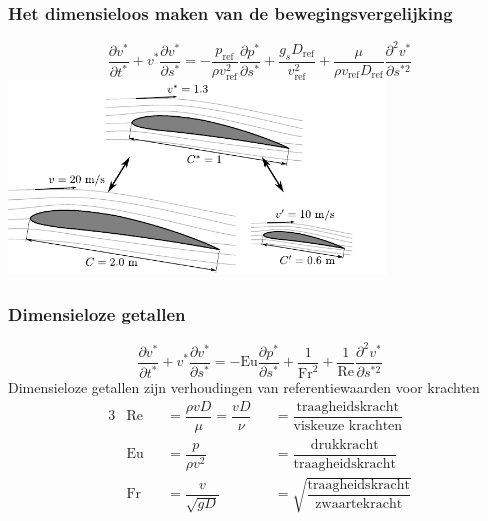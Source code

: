 \documentclass[t]{beamer}
\begin{document}
  	\begin{frame}
		\frametitle{Het dimensieloos maken van de bewegingsvergelijking}
		\vspace{-0.5cm}
		\begin{equation}
			\frac{\partial v^*}{\partial t^*} + v^* \frac{\partial v^*}{\partial s^*} = -\frac{p_{\text{ref}}}{\rho v_{\text{ref}}^2} \frac{\partial p^*}{\partial s^*} + \frac{g_s D_{\text{ref}}}{v_{\text{ref}}^2} + \frac{\mu}{\rho v_{\text{ref}} D_{\text{ref}}} \frac{\partial^2 v^*}{\partial s^{*2}}
			\label{eqn:navier-stokes dimensieloos}
		\end{equation}
		\pause
		\center
        \includegraphics[width=10cm]{../fig/gelijkvormigheid/Dimensieloze_stroomlijnen}
	\end{frame}
	\begin{frame}
		\frametitle{Dimensieloze getallen}
		\begin{equation}
			\frac{\partial v^*}{\partial t^*} + v^* \frac{\partial v^*}{\partial s^*} =  -\text{Eu} \frac{\partial p^*}{\partial s^*} + \frac{1}{\text{Fr}^2} + \frac{1}{\text{Re}} \frac{\partial^2 v^*}{\partial s^{*2}}
		\end{equation}
		\pause
		\center
		Dimensieloze getallen zijn verhoudingen van referentiewaarden voor krachten
		\pause
		\vspace{0.5cm}
		\begin{alignat*}{3}
			&\text{Re} &&= \dfrac{\rho v D}{\mu} = \dfrac{v D}{\nu} &&= \dfrac{\text{traagheidskracht}}{\text{viskeuze krachten}} \\
			&\text{Eu} &&= \dfrac{p}{\rho v^2} &&= \dfrac{\text{drukkracht}}{\text{traagheidskracht}} \\
			&\text{Fr} &&= \dfrac{v}{\sqrt{g D}} &&= \sqrt{\dfrac{\text{traagheidskracht}}{\text{zwaartekracht}}}
		\end{alignat*}
	\end{frame}
\end{document}
